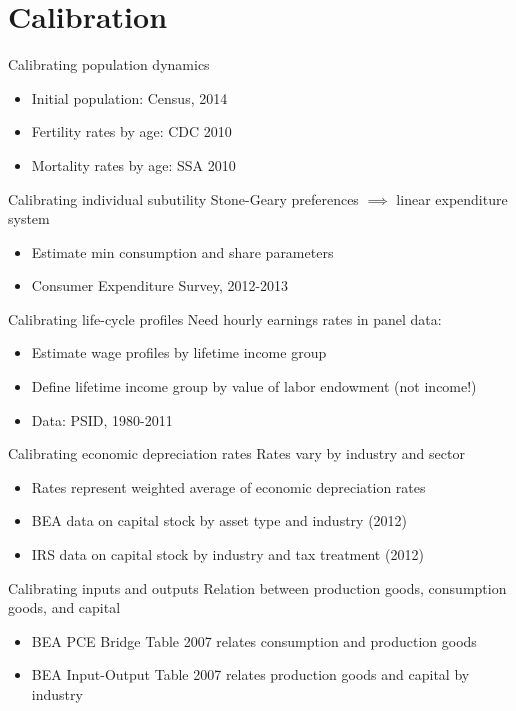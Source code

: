 \documentclass{beamer}
\begin{document}
\section{Calibration}


\begin{frame}{Calibrating population dynamics}
\begin{itemize}
\item Initial population: Census, 2014
\item Fertility rates by age: CDC 2010
\item Mortality rates by age: SSA 2010
\end{itemize}
\end{frame}


\begin{frame}{Calibrating individual subutility}
Stone-Geary preferences $\implies$ linear expenditure system
\begin{itemize}
\item Estimate min consumption and share parameters
\item Consumer Expenditure Survey, 2012-2013
\end{itemize}
\end{frame}

\begin{frame}{Calibrating life-cycle profiles}
Need hourly earnings rates in panel data:
\begin{itemize}
\item Estimate wage profiles by lifetime income group
\item Define lifetime income group by value of labor endowment (not income!)
\item Data: PSID, 1980-2011
\end{itemize}
\end{frame}
 
\begin{frame}{Calibrating economic depreciation rates}
Rates vary by industry and sector
\begin{itemize}
\item Rates represent weighted average of economic depreciation rates
\item BEA data on capital stock by asset type and industry (2012)
\item IRS data on capital stock by industry and tax treatment (2012)
\end{itemize}
\end{frame}

\begin{frame}{Calibrating inputs and outputs}
Relation between production goods, consumption goods, and capital
\begin{itemize}
\item BEA PCE Bridge Table 2007 relates consumption and production goods
\item BEA Input-Output Table 2007 relates production goods and capital by industry
\end{itemize}
\end{frame}
\end{document}
